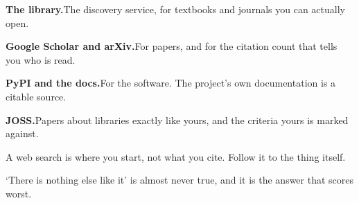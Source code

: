 \vspace{0.8cm}


\newpage
{}

\vspace{1.0cm}

{\LARGE
\textbf{\color{inkblue}The library.}\quad The discovery service, for
textbooks and journals you can actually open.

\vspace{1.0em}

\textbf{\color{inkteal}Google Scholar and arXiv.}\quad For papers, and
for the citation count that tells you who is read.

\vspace{1.0em}

\textbf{\color{inkred}PyPI and the docs.}\quad For the software. The
project's own documentation is a citable source.

\vspace{1.0em}

\textbf{\color{inkmauve}JOSS.}\quad Papers about libraries exactly like
yours, and the criteria yours is marked against.}

\vspace{1.2cm}

{\small\color{inkgrey} A web search is where you start, not what you
cite. Follow it to the thing itself.}

\newpage
{}

\vspace{0.5cm}


\vspace{0.3em}

\begin{center}
\end{center}

\vspace{0.2cm}

{\small\color{inkgrey} `There is nothing else like it' is almost never
true, and it is the answer that scores worst.}

\newpage
{}

\vspace{0.9cm}

